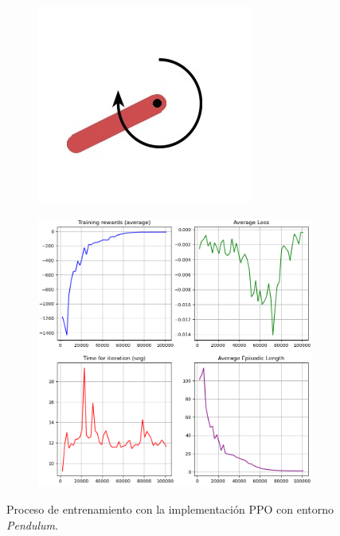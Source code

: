 \begin{figure}[hh]
    \centering
    \begin{subfigure}[b]{0.3\textwidth}
        \centering
        \includegraphics[width=\textwidth]{fig/new/Pendulum1_1.png}
        \caption{ }
        \label{fig:figura1_1}
    \end{subfigure}
    \hfill
    \begin{subfigure}[b]{0.6\textwidth}
        \centering
        \includegraphics[width=\textwidth]{fig/new/Pendulum1.png}
        \caption{ }
        \label{fig:figura2_2}
    \end{subfigure}
    \caption{Proceso de entrenamiento con la implementación PPO con entorno \textit{Pendulum}.}
    \label{fig:Pendulum1}
\end{figure}


